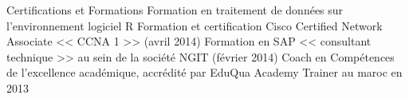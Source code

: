 \begin{rubric}{Certifications et Formations}
\entry*[]	 Formation en traitement de données sur l'environnement logiciel R
\entry*[]	 Formation et certification Cisco Certified Network Associate << CCNA 1 >> (avril 2014) %
\entry*[]	 Formation en SAP << consultant technique >> au sein de la société NGIT (février 2014) %
\entry*[] Coach en Compétences de l'excellence académique, accrédité par EduQua Academy Trainer au maroc en 2013 %
\end{rubric}
